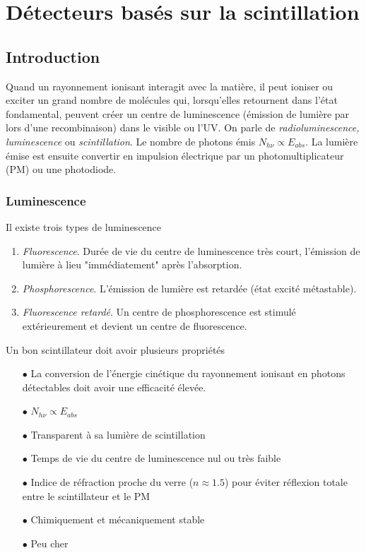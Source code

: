 \chapter{Détecteurs basés sur la scintillation}
\section{Introduction}
Quand un rayonnement ionisant interagit avec la matière, il peut ioniser ou exciter un grand
nombre de molécules qui, lorsqu'elles retournent dans l'état fondamental, peuvent créer un
centre de luminescence (émission de lumière par lors d'une recombinaison) dans le visible 
ou l'UV. On parle de \textit{radioluminescence, luminescence} ou \textit{scintillation}. Le 
nombre de photons émis $N_{h\nu}\propto E_{abs}$. La lumière émise est ensuite convertir en
impulsion électrique par un photomultiplicateur (PM) ou une photodiode.

\subsection{Luminescence}
Il existe trois types de luminescence
\begin{enumerate}
\item \textit{Fluorescence}. Durée de vie du centre de luminescence très court, l'émission de
lumière à lieu "immédiatement" après l'absorption.
\item \textit{Phosphorescence}. L'émission de lumière est retardée (état excité métastable).
\item \textit{Fluorescence retardé}. Un centre de phosphorescence est stimulé extérieurement et
devient un centre de fluorescence.
\end{enumerate}

Un bon scintillateur doit avoir plusieurs propriétés
\begin{itemize}
\item[$\bullet$] La conversion de l'énergie cinétique du rayonnement ionisant en photons détectables doit avoir une efficacité élevée.
\item[$\bullet$] $N_{h\nu} \propto E_{abs}$
\item[$\bullet$] Transparent à sa lumière de scintillation
\item[$\bullet$] Temps de vie du centre de luminescence nul ou très faible
\item[$\bullet$] Indice de réfraction proche du verre ($n\approx1.5$) pour éviter réflexion totale entre
le scintillateur et le PM
\item[$\bullet$] Chimiquement et mécaniquement stable
\item[$\bullet$] Peu cher
\end{itemize}\ 

